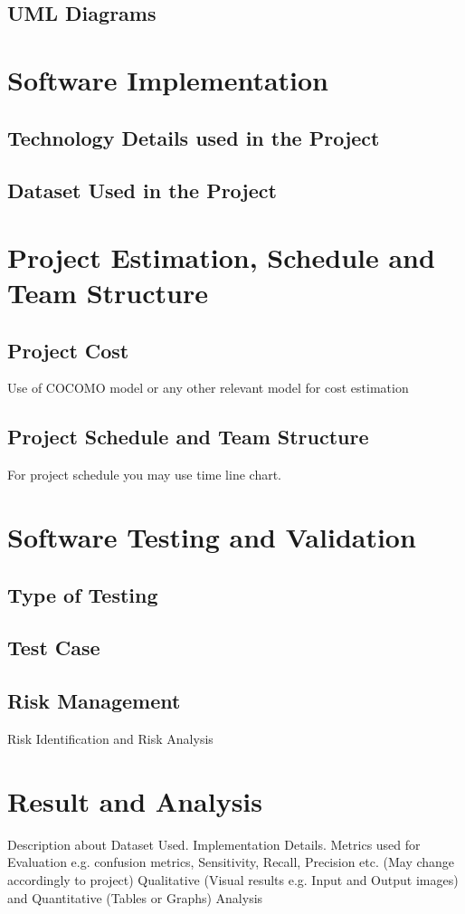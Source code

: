 \documentclass[oneside,a4paper,12pt]{report}
\begin{document}
\section{UML Diagrams} 

\chapter{Software Implementation}
\section{Technology Details used in the Project}
\section{Dataset Used in the Project}

\chapter{Project Estimation, Schedule and Team Structure}
\section{Project Cost}
Use of COCOMO model or any other relevant model for cost estimation
\section{Project Schedule and Team Structure}
For project schedule you may use time line chart.

\chapter{Software Testing and Validation}
\section{Type of Testing}
\section{Test Case}
\section{Risk Management}
Risk Identification and Risk Analysis

\chapter{Result and Analysis}
Description about Dataset Used.
Implementation Details.
Metrics used for Evaluation e.g. confusion metrics, Sensitivity, Recall, Precision etc. (May change accordingly to project)
Qualitative (Visual results e.g. Input and Output images) and Quantitative (Tables or Graphs) Analysis
\end{document}
